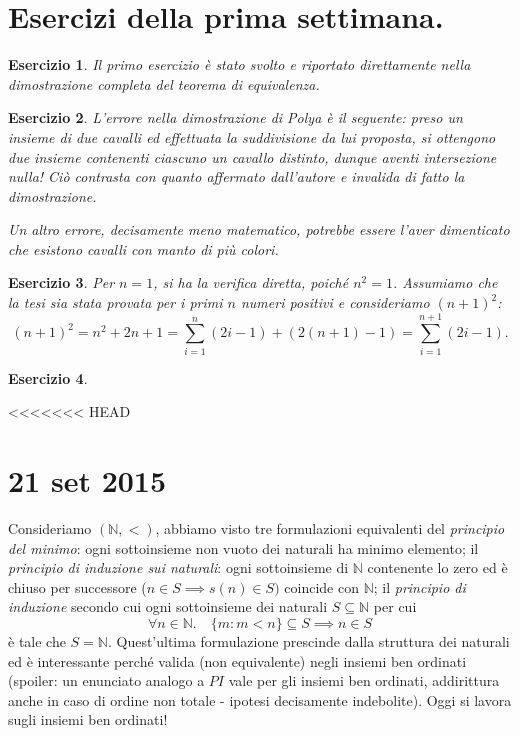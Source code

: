 \documentclass[fontsize = 11 pt, paper=A4, oneside, index=totoc, hyperref]{book}
\theoremstyle{definition}
\theoremstyle{plain}
\newtheorem{exe}{Esercizio}[section]
\newcommand{\N}{\mathbb{N}}
\begin{document}
\section{Esercizi della prima settimana.}
\begin{exe}
  Il primo esercizio è stato svolto e riportato direttamente nella dimostrazione completa del teorema di equivalenza.
\end{exe}
\begin{exe}
  L'errore nella dimostrazione di Polya è il seguente: preso un insieme di due cavalli ed effettuata la suddivisione da lui proposta, si ottengono due insieme contenenti ciascuno un cavallo distinto, dunque aventi intersezione nulla! Ciò contrasta con quanto affermato dall'autore e invalida di fatto la dimostrazione.

  Un altro errore, decisamente meno matematico, potrebbe essere l'aver dimenticato che esistono cavalli con manto di più colori.
\end{exe}
\begin{exe}
  Per \(n = 1\), si ha la verifica diretta, poiché \(n^2 = 1\). Assumiamo che la tesi sia stata provata per i primi \(n\) numeri positivi e consideriamo \((n+1)^2\):
  \begin{equation}
    (n+1)^2 = n^2 + 2n + 1 = \sum_{i=1}^n (2i - 1) + (2(n + 1) - 1) = \sum_{i = 1}^{n+1}(2i - 1).
  \end{equation}
\end{exe}
\begin{exe}
\end{exe}

<<<<<<< HEAD
\section{21 set 2015}

Consideriamo \((\N, <)\), abbiamo visto tre formulazioni equivalenti del \emph{principio del minimo}: ogni sottoinsieme non vuoto dei naturali ha minimo elemento; il \emph{principio di induzione sui naturali}: ogni sottoinsieme di \(\N\) contenente lo zero ed è chiuso per successore (\(n \in S \implies s(n) \in S)\) coincide con \(\N\); il \emph{principio di induzione} secondo cui ogni sottoinsieme dei naturali \(S \subseteq \N\) per cui
\begin{equation}
  \forall n \in \N.\quad \lbrace m \colon m < n\rbrace \subseteq S \implies n \in S
\end{equation}
è tale che \(S = \N\). Quest'ultima formulazione prescinde dalla struttura dei naturali ed è interessante perché valida (non equivalente) negli insiemi ben ordinati (spoiler: un enunciato analogo a \(PI\) vale per gli insiemi ben ordinati, addirittura anche in caso di ordine non totale - ipotesi decisamente indebolite). Oggi si lavora sugli insiemi ben ordinati!
\end{document}
